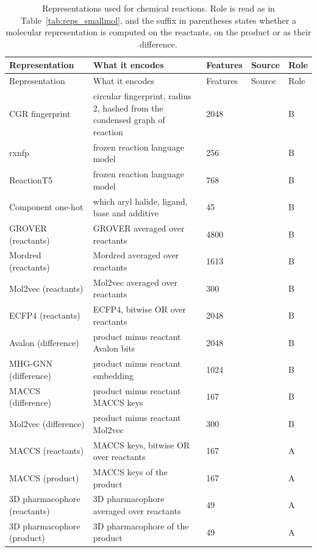 {\let\small\footnotesize
\begin{longtable}{P{3.0cm}P{5.0cm}P{1.5cm}P{1.5cm}P{1.4cm}}
\caption[Representations used for chemical reactions.]{Representations used for chemical reactions. Role is read as in Table~\ref{tab:reps_smallmol}, and the suffix in parentheses states whether a molecular representation is computed on the reactants, on the product or as their difference.}\label{tab:reps_reactions}\\
\toprule
Representation & What it encodes & Features & Source & Role \\
\midrule
\endfirsthead
\toprule
Representation & What it encodes & Features & Source & Role \\
\midrule
\endhead
\bottomrule
\endfoot
CGR fingerprint & circular fingerprint, radius 2, hashed from the condensed graph of reaction & 2048 & \citep{Hoonakker2011} & B \\
rxnfp & frozen reaction language model & 256 & \citep{Schwaller2021rxnfp} & B \\
ReactionT5 & frozen reaction language model & 768 & \citep{Sagawa2023ReactionT5} & B \\
Component one-hot & which aryl halide, ligand, base and additive & 45 & \citep{Ahneman2018} & B \\
GROVER (reactants) & GROVER averaged over reactants & 4800 & \citep{Rong2020GROVER} & B \\
Mordred (reactants) & Mordred averaged over reactants & 1613 & \citep{Moriwaki2018} & B \\
Mol2vec (reactants) & Mol2vec averaged over reactants & 300 & \citep{Jaeger2018} & B \\
ECFP4 (reactants) & ECFP4, bitwise OR over reactants & 2048 & \citep{rogers2010} & B \\
Avalon (difference) & product minus reactant Avalon bits & 2048 & \citep{Gedeck2006} & B \\
MHG-GNN (difference) & product minus reactant embedding & 1024 & \citep{kishimoto2023} & B \\
MACCS (difference) & product minus reactant MACCS keys & 167 & \citep{Durant2002} & B \\
Mol2vec (difference) & product minus reactant Mol2vec & 300 & \citep{Jaeger2018} & B \\
MACCS (reactants) & MACCS keys, bitwise OR over reactants & 167 & \citep{Durant2002} & A \\
MACCS (product) & MACCS keys of the product & 167 & \citep{Durant2002} & A \\
3D pharmacophore (reactants) & 3D pharmacophore averaged over reactants & 49 & \citep{rdkit} & A \\
3D pharmacophore (product) & 3D pharmacophore of the product & 49 & \citep{rdkit} & A \\
\end{longtable}}

